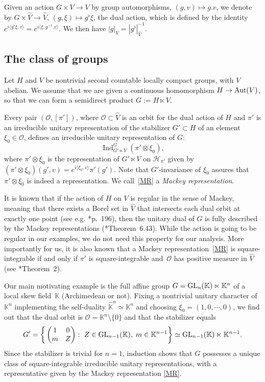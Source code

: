 \documentclass[a4paper,11pt,reqno]{amsart}
\numberwithin{equation}{section}
\theoremstyle{remark}
\theoremstyle{definition}
\newcommand{\CH}{\mathcal H}
\newcommand{\K}{\mathbb K}
\newcommand{\Ind}{\operatorname{Ind}}
\begin{document}
Given an action $G\times V\to V$ by group automorphisms, $(g,v)\mapsto g.v$, we denote by $G\times \hat V\to \hat V$, $(g,\xi)\mapsto g^\flat\xi$, the dual action, which is
defined by the identity  $e^{i\langle g^\flat\xi,v\rangle}=e^{i\langle\xi,g^{-1}.v\rangle}$. We then have $|g|_V=|g^\flat|_{\hat V}^{-1}$.


\subsection{The class of groups} \label{ssec:class}

Let  $H$  and $V$  be  nontrivial second countable locally compact  groups, with $V$ abelian.
We assume that we are given a continuous homomorphism $H\to{\rm Aut}(V)$, so that we can form a semidirect product $G:=H\ltimes V$.

Every pair $(\mathcal O, [\pi'])$, where $\mathcal O\subset \hat V$ is an orbit for the dual action of $H$ and $\pi'$ is an  irreducible unitary representation of
 the stabilizer $G'\subset H$ of an element $\xi_0\in \mathcal O$, defines an irreducible unitary representation of $G$:
\begin{equation}
\label{MR}
{\Ind}_{G'\ltimes V}^{G}(\pi'\otimes \xi_0),
\end{equation}
where  $\pi'\otimes \xi_0$ is the representation of $G'\ltimes V$   on $\CH_{\pi'}$
given  by
$(\pi'\otimes \xi_0)(g',v)=e^{i\langle\xi_0,v\rangle} \pi'(g')$. Note that $G'$-invariance of $\xi_0$ assures that $\pi'\otimes\xi_0$ is indeed a representation. We call~\eqref{MR} a \emph{Mackey representation}.

It is known that if the action of $H$ on $V$ is regular in the sense of Mackey, meaning that there exists a Borel set in $\hat V$ that intersects each dual orbit at exactly one point (see e.g$.$ \cite{Folland}*{p.~196}), then the  unitary dual  of $G$ is fully described by the Mackey representations (\cite{Folland}*{Theorem~6.43}). While the action is going to be regular in our examples, we do not need this property for our analysis. More importantly for us, it is also known that a Mackey representation~\eqref{MR} is square-integrable if and only if $\pi'$ is square-integrable and~$\mathcal O$ has positive measure in $\hat V$ (see \cite{ACVL}*{Theorem~2}).

Our main motivating example is  the full affine group $G={\rm GL}_n(\K)\ltimes \K^n$ of a local skew field~$\K$ (Archimedean or not).
Fixing a nontrivial unitary character of $\K^n$ implementing the self-duality $\hat {\K}^n\simeq \K^n$ and
 choosing $\xi_0=(1,0,\cdots,0)$, we find out that the dual orbit is
 $ \mathcal O=\K^n\setminus\{0\}$ and that the stabilizer equals
  $$
  G'=\bigg\{\begin{pmatrix}1&0\\m&Z\end{pmatrix}: \ Z\in {\rm GL}_{n-1}(\K),\; m\in \K^{n-1}\bigg\}\simeq {\rm GL}_{n-1}(\K)\ltimes \K^{n-1}.
  $$
Since the stabilizer is trivial for $n=1$, induction shows that $G$ possesses a unique class of square-integrable irreducible unitary representations,
with a representative given by the Mackey representation \eqref{MR}.
\end{document}
